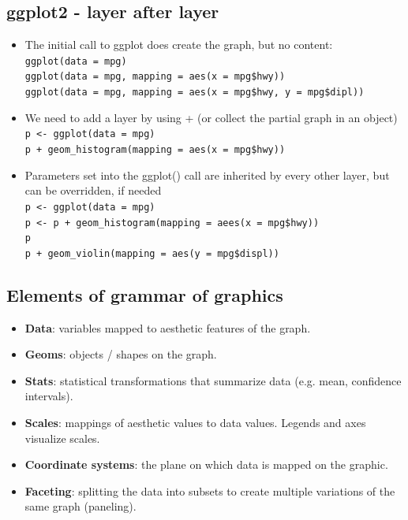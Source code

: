 \documentclass[a4paper]{article}
\begin{document}
		\newpage
	
		\subsection{ggplot2 - layer after layer}
		
		\begin{itemize}
			\item The initial call to ggplot does create the graph, but no content: \\
				\texttt{ggplot(data = mpg)} \\
				\texttt{ggplot(data = mpg, mapping = aes(x = mpg\$hwy))} \\
				\texttt{ggplot(data = mpg, mapping = aes(x = mpg\$hwy, y = mpg\$dipl))}
			\item We need to add a layer by using + (or collect the partial graph in an object) \\
				\texttt{p <- ggplot(data = mpg)} \\
				\texttt{p + geom\_histogram(mapping = aes(x = mpg\$hwy))}
			\item Parameters set into the ggplot() call are inherited by every other layer, but can be overridden, if needed \\
				\texttt{p <- ggplot(data = mpg)} \\
				\texttt{p <- p + geom\_histogram(mapping = aees(x = mpg\$hwy))} \\
				\texttt{p} \\
				\texttt{p +  geom\_violin(mapping = aes(y = mpg\$displ))}
		\end{itemize}
	
		\subsection{Elements of grammar of graphics}
		
		\begin{itemize}
			\item \textbf{Data}: variables mapped to aesthetic features of the graph.
			\item \textbf{Geoms}: objects / shapes on the graph.
			\item \textbf{Stats}: statistical transformations that summarize data (e.g. mean, confidence intervals).
			\item \textbf{Scales}: mappings of aesthetic values to data values. 
				Legends and axes visualize scales.
			\item \textbf{Coordinate systems}: the plane on which data is mapped on the graphic.
			\item \textbf{Faceting}: splitting the data into subsets to create multiple variations of the same graph (paneling). 
		\end{itemize}
	
\end{document}
